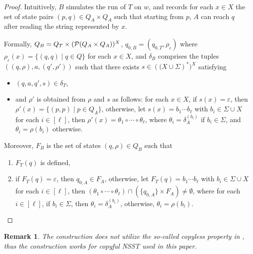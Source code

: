 \documentclass[sigplan,review,anonymous]{acmart}\settopmatter{printfolios=true,printccs=false,printacmref=false}
\newcommand{\tmtextit}[1]{{\itshape{#1}}}
\newtheorem{remark}{Remark}
\newcommand\NSST{{\sf NSST}}
\begin{document}
%
\begin{proof}
Intuitively, $B$ simulates the run of $T$ on $w$, and records  for each $x \in X$ the set of state pairs $(p, q) \in Q_A \times Q_A$ such that starting from $p$, $A$ can reach $q$ after reading the string represented by $x$.

Formally, $Q_B = Q_T \times (\mathcal{P}(Q_A \times Q_A ))^{X}$, $q_{0, B} = (q_{0, T}, \rho_{\varepsilon})$ where $\rho_{\varepsilon} (x) = \{(q, q) \mid q \in Q\}$ for each $x \in X$, and $\delta_{B}$ comprises the tuples $((q, \rho), a, (q', \rho'))$ such that there exists $s \in \left((X \cup \Sigma\right)^*)^X$ satisfying
\begin{itemize}
\item $(q, a, q', s) \in \delta_T$, 
\item and $\rho'$ is obtained from $\rho$ and $s$ as follows: for each $x \in X$, if $s(x) = \varepsilon$, then $\rho'(x) = \{(p, p) \mid p \in Q_A\}$, otherwise, let $s(x) = b_1 \cdots b_\ell$ with $b_i \in \Sigma \cup X$ for each $i \in [\ell]$, then $\rho'(x) = \theta_1 \circ \cdots \circ \theta_\ell$, where $\theta_i = \delta^{(b_i)}_A$ if $b_i \in \Sigma$, and $\theta_i = \rho(b_i)$ otherwise.
%
\end{itemize}

Moreover, $F_B$ is the set of states $(q, \rho) \in Q_B$
such that
\begin{enumerate}
  \item $F_T (q)$ is defined,
  
  \item if $F_T(q) = \varepsilon$, then $q_{0, A}  \in F_A$, otherwise, 
let $F_T(q) = b_1 \cdots b_\ell$ with $b_i \in \Sigma \cup X$ for each $i \in [\ell]$, then $(\theta_1 \circ \cdots \circ \theta_\ell) \cap (\{q_{0,A}\} \times F_A) \neq \emptyset$, where for each $i \in [\ell]$, if $b_i \in \Sigma$, then $\theta_i = \delta^{(b_i)}_A$, otherwise, $\theta_i = \rho(b_i)$.
\end{enumerate}
\end{proof}

\begin{remark}
%  
  The construction does not utilize the so-called \tmtextit{copyless}
  property in {\cite{AC10,AD11}},
  thus the construction works for \emph{copyful} \NSST{} used in this paper.
\end{remark}
\end{document}
